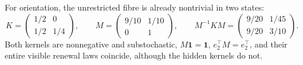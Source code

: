 For orientation, the unrestricted fibre is already nontrivial in two states:
\[
K=\begin{pmatrix}1/2&0\\1/2&1/4\end{pmatrix},\qquad
M=\begin{pmatrix}9/10&1/10\\0&1\end{pmatrix},\qquad
M^{-1}KM=\begin{pmatrix}9/20&1/45\\9/20&3/10\end{pmatrix}.
\]
Both kernels are nonnegative and substochastic,
\(M\mathbf1=\mathbf1\), \(e_2^\top M=e_2^\top\), and their entire visible
renewal laws coincide, although the hidden kernels do not.
